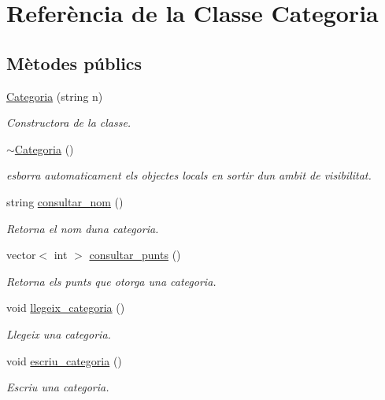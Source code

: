\hypertarget{class_categoria}{}\section{Referència de la Classe Categoria}
\label{class_categoria}
\subsection*{Mètodes públics}
\begin{DoxyCompactItemize}
\item 
\mbox{\hyperlink{class_categoria_a789846d6b1d9b83ce793ade66870a441}{Categoria}} (string n)
\begin{DoxyCompactList}\small\item\em Constructora de la classe. \end{DoxyCompactList}\item 
\mbox{\hyperlink{class_categoria_a2fa3d74dfe8be2db3838980de35e0eb6}{$\sim$\+Categoria}} ()
\begin{DoxyCompactList}\small\item\em esborra automaticament els objectes locals en sortir d\textquotesingle{}un ambit de visibilitat. \end{DoxyCompactList}\item 
string \mbox{\hyperlink{class_categoria_a99e68d77bab3b652aee54ba09e302238}{consultar\+\_\+nom}} ()
\begin{DoxyCompactList}\small\item\em Retorna el nom d\textquotesingle{}una categoria. \end{DoxyCompactList}\item 
vector$<$ int $>$ \mbox{\hyperlink{class_categoria_a67d5c6d5efb82b9b173079bb01f0ca24}{consultar\+\_\+punts}} ()
\begin{DoxyCompactList}\small\item\em Retorna els punts que otorga una categoria. \end{DoxyCompactList}\item 
void \mbox{\hyperlink{class_categoria_afcc187c0f598d99f85873ef3fc60013f}{llegeix\+\_\+categoria}} ()
\begin{DoxyCompactList}\small\item\em Llegeix una categoria. \end{DoxyCompactList}\item 
void \mbox{\hyperlink{class_categoria_ace72584479577989887645222ca5f540}{escriu\+\_\+categoria}} ()
\begin{DoxyCompactList}\small\item\em Escriu una categoria. \end{DoxyCompactList}\end{DoxyCompactItemize}

